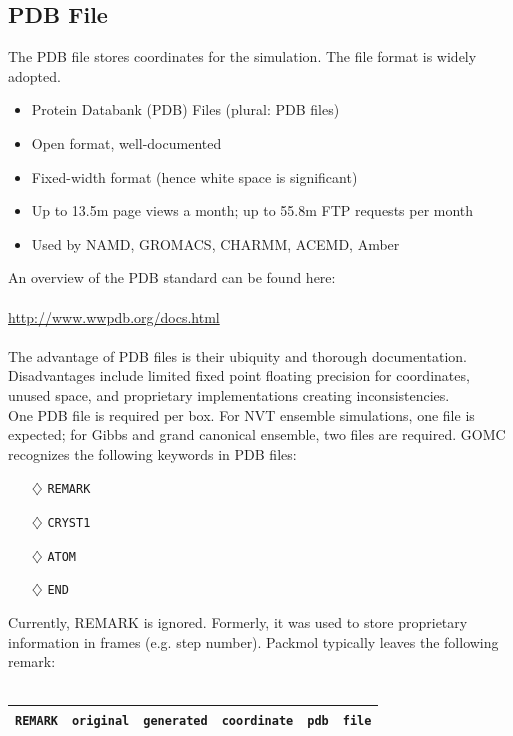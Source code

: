 \subsection{PDB File}
The PDB file stores coordinates for the simulation. The file format is widely adopted.
\begin{itemize}
\item Protein Databank (PDB) Files (plural: PDB files)
\item Open format, well-documented
\item Fixed-width format (hence white space is significant)
\item Up to 13.5m page views a month; up to 55.8m FTP requests per month
\item Used by NAMD, GROMACS, CHARMM, ACEMD, Amber
\end{itemize}
An overview of the PDB standard can be found here:\\\\
\url{http://www.wwpdb.org/docs.html}\\\\
The advantage of PDB files is their ubiquity and thorough documentation. Disadvantages include limited fixed point floating precision for coordinates, unused space, and proprietary implementations creating inconsistencies.\\
One PDB file is required per box. For NVT ensemble simulations, one file is expected; for Gibbs and grand canonical ensemble, two files are required.
GOMC recognizes the following keywords in PDB files:
\begin{itemize}
\item[$\diamondsuit$] \texttt{REMARK}
\item[$\diamondsuit$] \texttt{CRYST1}
\item[$\diamondsuit$] \texttt{ATOM}
\item[$\diamondsuit$] \texttt{END}
\end{itemize}
Currently, REMARK is ignored. Formerly, it was used to store proprietary information in frames (e.g. step number). Packmol typically leaves the following remark:\\\\
\begin{tabularx}{\textwidth}{| X | X | X | X | X | X |}
\hline
  \texttt{REMARK} & \texttt{original} & \texttt{generated} & \texttt{coordinate} & \texttt{pdb} & \texttt{file}  \\
\hline
\end{tabularx}\\\\
